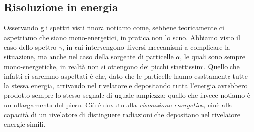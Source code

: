 \subsection{Risoluzione in energia}

Osservando gli spettri visti finora notiamo come, sebbene teoricamente ci aspettiamo che siano mono-energetici, in pratica non lo sono. Abbiamo visto il caso dello spettro $\gamma$, in cui intervengono diversi meccanismi a complicare la situazione, ma anche nel caso della sorgente di particelle $\alpha$, le quali sono sempre mono-energetiche, in realtà non si ottengono dei picchi strettissimi. Quello che infatti ci saremmo aspettati è che, dato che le particelle hanno esattamente tutte la stessa energia, arrivando nel rivelatore e depositando tutta l'energia avrebbero prodotto sempre lo stesso segnale di uguale ampiezza; quello che invece notiamo è un allargamento del picco. Ciò è dovuto alla \textit{risoluzione energetica}, cioè alla capacità di un rivelatore di distinguere radiazioni che depositano nel rivelatore energie simili.

